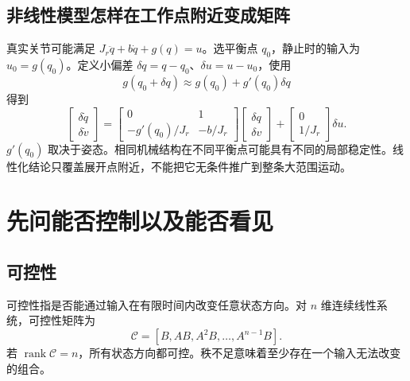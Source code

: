 \subsection{非线性模型怎样在工作点附近变成矩阵}

真实关节可能满足 $J_r\ddot q+b\dot q+g(q)=u$。选平衡点 $q_0$，静止时的输入为 $u_0=g(q_0)$。定义小偏差 $\delta q=q-q_0$、$\delta u=u-u_0$，使用
\[
g(q_0+\delta q)\approx g(q_0)+g'(q_0)\delta q
\]
得到
\[
\begin{bmatrix}\delta\dot q\\\delta\dot v\end{bmatrix}
=\begin{bmatrix}0&1\\-g'(q_0)/J_r&-b/J_r\end{bmatrix}
\begin{bmatrix}\delta q\\\delta v\end{bmatrix}
+\begin{bmatrix}0\\1/J_r\end{bmatrix}\delta u.
\]
$g'(q_0)$ 取决于姿态。相同机械结构在不同平衡点可能具有不同的局部稳定性。线性化结论只覆盖展开点附近，不能把它无条件推广到整条大范围运动。

\section{先问能否控制以及能否看见}

\subsection{可控性}

可控性指是否能通过输入在有限时间内改变任意状态方向。对 $n$ 维连续线性系统，可控性矩阵为
\[
\mathcal C=[B,AB,A^2B,\ldots,A^{n-1}B].
\]
若 $\operatorname{rank}\mathcal C=n$，所有状态方向都可控。秩不足意味着至少存在一个输入无法改变的组合。

